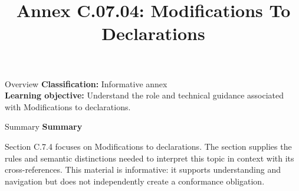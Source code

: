 \documentclass[10pt,letterpaper]{article}
\title{Annex C.07.04: Modifications To Declarations}
\author{}
\date{}
\begin{document}
\maketitle
\begin{CornellOverviewBox}{Overview}
\textbf{Classification:} Informative annex\\[2pt]
\textbf{Learning objective:} Understand the role and technical guidance associated with Modifications to declarations.
\end{CornellOverviewBox}\begin{CornellSummaryBox}{Summary}
{\sffamily\bfseries\color{Accent} Summary}\par\vspace{3pt}Section C.7.4 focuses on Modifications to declarations. The section supplies the rules and semantic distinctions needed to interpret this topic in context with its cross-references. This material is informative: it supports understanding and navigation but does not independently create a conformance obligation.
\end{CornellSummaryBox}
\end{document}
